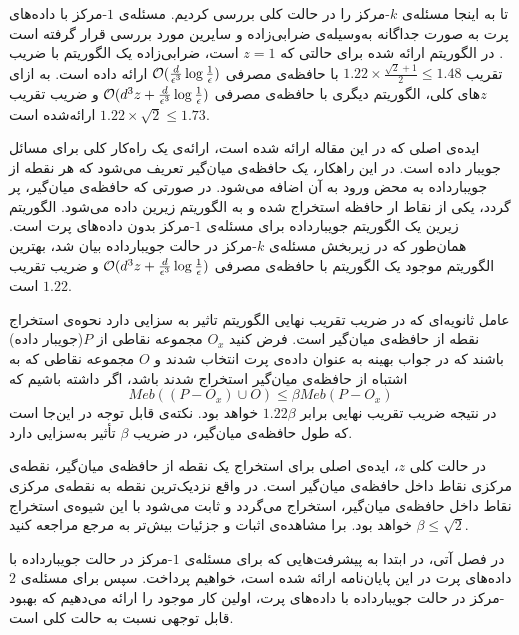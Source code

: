 تا به اینجا مسئله‌ی $k$-مرکز را در حالت کلی بررسی کردیم. مسئله‌ی $1$-مرکز با داده‌های پرت به صورت جداگانه به‌وسیله‌ی ضرابی‌زاده و سایرین مورد بررسی قرار گرفته است . در الگوریتم ارائه شده برای حالتی که $z = 1$ است، ضرابی‌زاده یک الگوریتم با ضریب تقریب $1.22 \times \frac{\sqrt{2} + 1}{2} \leq 1.48$ با حافظه‌ی مصرفی $\mathcal{O}(\frac{d}{\epsilon^3} \log{\frac{1}{\epsilon}})$ ارائه داده است. به ازای $z$های کلی، الگوریتم دیگری با حافظه‌ی مصرفی $\mathcal{O}(d^3z + \frac{d}{\epsilon^3}\log{\frac{1}{\epsilon}})$ و ضریب تقریب $1.22 \times \sqrt{2} \leq 1.73$ ارائه‌شده است.

ایده‌ی اصلی که در این مقاله ارائه شده است، ارائه‌ی یک راه‌کار کلی برای مسائل جویبار داده است. در این راهکار، یک حافظه‌ی میان‌گیر تعریف می‌شود که هر نقطه از جویبارداده به محض ورود به آن اضافه می‌شود. در صورتی که حافظه‌ی میان‌گیر، پر گردد، یکی از نقاط ار حافظه استخراج شده و به الگوریتم زیرین داده می‌شود. الگوریتم زیرین یک الگوریتم جویبارداده برای مسئله‌ی $1$-مرکز بدون داده‌های پرت است. همان‌طور که در زیربخش مسئله‌ی $k$-مرکز در حالت جویبارداده بیان شد، بهترین الگوریتم موجود یک الگوریتم با حافظه‌ی مصرفی $\mathcal{O}(d^3z + \frac{d}{\epsilon^3}\log{\frac{1}{\epsilon}})$ و ضریب تقریب $1.22$ است.

عامل ثانویه‌ای که در ضریب تقریب نهایی الگوریتم تاثیر به سزایی دارد نحوه‌ی استخراج نقطه از حافظه‌ی میان‌گیر است. فرض کنید $O_x$ مجموعه نقاطی از $P$(جویبار داده) باشند که در جواب بهینه به عنوان داده‌ی پرت انتخاب شدند و $O$ مجموعه نقاطی که به اشتباه از‌ حافظه‌ی میان‌گیر استخراج شدند باشد، اگر داشته باشیم که
$$Meb((P - O_x) \cup O) \leq \beta Meb(P - O_x)$$
در نتیجه ضریب تقریب نهایی برابر $1.22 \beta$ خواهد بود. نکته‌ی قابل توجه در این‌جا است که طول حافظه‌ی میان‌گیر، در ضریب $\beta$ تأثیر به‌سزایی دارد.

در حالت کلی $z$، ایده‌ی اصلی برای استخراج یک نقطه از حافظه‌ی میان‌گیر، نقطه‌ی مرکزی نقاط داخل حافظه‌ی میان‌گیر است. در واقع نزدیک‌ترین نقطه‌ به نقطه‌ی مرکزی نقاط داخل حافظه‌ی میان‌گیر، استخراج می‌گردد و ثابت می‌شود با این شیوه‌ی استخراج $\beta \leq \sqrt{2}$ خواهد بود. برا مشاهده‌ی اثبات و جزئیات بیش‌تر به مرجع  مراجعه کنید.

در فصل آتی، در ابتدا به پیشرفت‌هایی که برای مسئله‌ی $1$-مرکز در حالت جویبار‌داده با داده‌های پرت در این پایان‌نامه ارائه شده است، خواهیم پرداخت. سپس برای مسئله‌ی $2$-مرکز در حالت جویبارداده با داده‌های پرت، اولین کار موجود را ارائه می‌دهیم که بهبود قابل توجهی نسبت به حالت کلی است.

